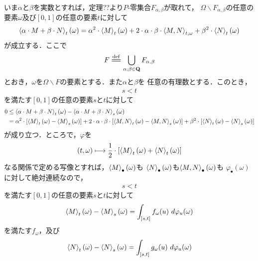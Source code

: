 	\begin{sketch}
		いま$\alpha$と$\beta$を実数とすれば，定理??より$P$-零集合$F_{\alpha,\beta}$が取れて，
		$\Omega \backslash F_{\alpha,\beta}$の任意の要素$\omega$及び$[0,1]$の任意の要素$t$に対して
		\begin{align}
			\inprod<\alpha \cdot M + \beta \cdot N>_{t}(\omega)
			= \alpha^{2} \cdot \inprod<M>_{t}(\omega) 
			+ 2 \cdot \alpha \cdot \beta \cdot \inprod<M,N>_{t,\omega}
			+ \beta^{2} \cdot \inprod<N>_{t}(\omega)
		\end{align}
		が成立する．ここで
		\begin{align}
			F \defeq \bigcup_{\alpha, \beta \in \Q} F_{\alpha,\beta}
		\end{align}
		とおき，$\omega$を$\Omega \backslash F$の要素とする．また$\alpha$と$\beta$を
		任意の有理数とする．このとき，
		\begin{align}
			s < t
		\end{align}
		を満たす$[0,1]$の任意の要素$s$と$t$に対して
		\begin{align}
			0 &\leq  \inprod<\alpha \cdot M + \beta \cdot N>_{t}(\omega) 
			- \inprod<\alpha \cdot M + \beta \cdot N>_{s}(\omega) \\
			&= \alpha^{2} \cdot \left[\inprod<M>_{t}(\omega) - \inprod<M>_{s}(\omega)\right]
			+ 2 \cdot \alpha \cdot \beta \cdot 
			\left[\inprod<M,N>_{t}(\omega) - \inprod<M,N>_{s}(\omega)\right]
			+ \beta^{2} \cdot \left[\inprod<N>_{t}(\omega) - \inprod<N>_{s}(\omega)\right]
			\label{fom:Holder_ineqaulity_for_stochastic_integrals_1}
		\end{align}
		が成り立つ．ところで，$\varphi$を
		\begin{align}
			(t,\omega) \longmapsto \frac{1}{2} \cdot 
			\left[\inprod<M>_{t}(\omega) + \inprod<N>_{t}(\omega)\right]
		\end{align}
		なる関係で定める写像とすれば，$\inprod<M>_{\bullet}(\omega)$も
		$\inprod<N>_{\bullet}(\omega)$も$\inprod<M,N>_{\bullet}(\omega)$も
		$\varphi_{\bullet}(\omega)$に対して絶対連続なので，
		\begin{align}
			s < t
		\end{align}
		を満たす$[0,1]$の任意の要素$s$と$t$に対して
		\begin{align}
			\inprod<M>_{t}(\omega) - \inprod<M>_{s}(\omega)
			= \int_{]s,t]} f_{\omega}(u)\ d\varphi_{u}(\omega)
		\end{align}
		を満たす$f_{\omega}$，及び
		\begin{align}
			\inprod<N>_{t}(\omega) - \inprod<N>_{s}(\omega)
			= \int_{]s,t]} g_{\omega}(u)\ d\varphi_{u}(\omega)

\end{align}
\end{sketch}
